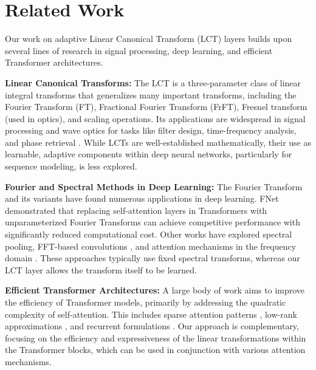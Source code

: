 \section{Related Work}
\label{sec:related_work}

Our work on adaptive Linear Canonical Transform (LCT) layers builds upon several lines of research in signal processing, deep learning, and efficient Transformer architectures.

\textbf{Linear Canonical Transforms:} The LCT \citep{wolf1979integral, healy2016linear} is a three-parameter class of linear integral transforms that generalizes many important transforms, including the Fourier Transform (FT), Fractional Fourier Transform (FrFT), Fresnel transform (used in optics), and scaling operations. Its applications are widespread in signal processing and wave optics for tasks like filter design, time-frequency analysis, and phase retrieval \citep{ozaktas2001fractional, pei2000two}. While LCTs are well-established mathematically, their use as learnable, adaptive components within deep neural networks, particularly for sequence modeling, is less explored.

\textbf{Fourier and Spectral Methods in Deep Learning:} The Fourier Transform and its variants have found numerous applications in deep learning. FNet \citep{lee2021fnet} demonstrated that replacing self-attention layers in Transformers with unparameterized Fourier Transforms can achieve competitive performance with significantly reduced computational cost. Other works have explored spectral pooling, FFT-based convolutions \citep{mathieu2013fast}, and attention mechanisms in the frequency domain \citep{chi2022flashfft}. These approaches typically use fixed spectral transforms, whereas our LCT layer allows the transform itself to be learned.

\textbf{Efficient Transformer Architectures:} A large body of work aims to improve the efficiency of Transformer models, primarily by addressing the quadratic complexity of self-attention. This includes sparse attention patterns \citep{child2019generating}, low-rank approximations \citep{wang2020linformer}, and recurrent formulations \citep{dai2019transformerxl}. Our approach is complementary, focusing on the efficiency and expressiveness of the linear transformations within the Transformer blocks, which can be used in conjunction with various attention mechanisms.

